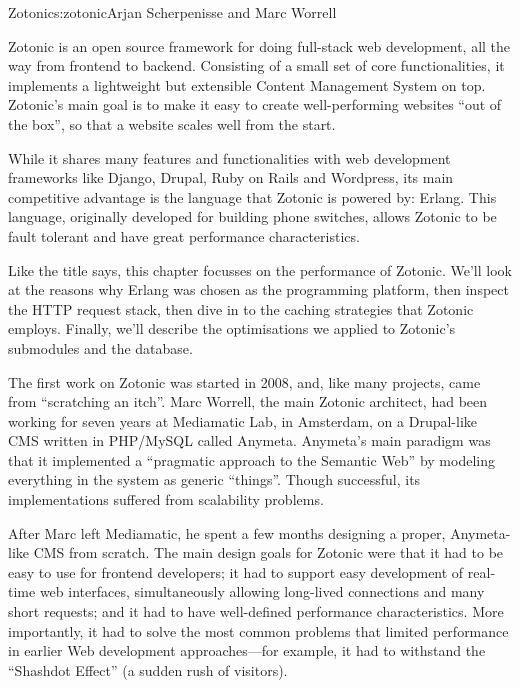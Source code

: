 \begin{aosachapter}{Zotonic}{s:zotonic}{Arjan Scherpenisse and Marc Worrell}


Zotonic is an open source framework for doing full-stack web
development, all the way from frontend to backend. Consisting of a small
set of core functionalities, it implements a lightweight but extensible
Content Management System on top. Zotonic's main goal is to make it easy
to create well-performing websites ``out of the box'', so that a website
scales well from the start.

While it shares many features and functionalities with web development
frameworks like Django, Drupal, Ruby on Rails and Wordpress, its main
competitive advantage is the language that Zotonic is powered by:
Erlang. This language, originally developed for building phone switches,
allows Zotonic to be fault tolerant and have great performance
characteristics.

Like the title says, this chapter focusses on the performance of
Zotonic. We'll look at the reasons why Erlang was chosen as the
programming platform, then inspect the HTTP request stack, then dive in
to the caching strategies that Zotonic employs. Finally, we'll describe
the optimisations we applied to Zotonic's submodules and the database.


The first work on Zotonic was started in 2008, and, like many projects,
came from ``scratching an itch''. Marc Worrell, the main Zotonic
architect, had been working for seven years at Mediamatic Lab, in
Amsterdam, on a Drupal-like CMS written in PHP/MySQL called Anymeta.
Anymeta's main paradigm was that it implemented a ``pragmatic approach
to the Semantic Web'' by modeling everything in the system as generic
``things''. Though successful, its implementations suffered from
scalability problems.

After Marc left Mediamatic, he spent a few months designing a proper,
Anymeta-like CMS from scratch. The main design goals for Zotonic were
that it had to be easy to use for frontend developers; it had to support
easy development of real-time web interfaces, simultaneously allowing
long-lived connections and many short requests; and it had to have
well-defined performance characteristics. More importantly, it had to
solve the most common problems that limited performance in earlier Web
development approaches---for example, it had to withstand the ``Shashdot
Effect'' (a sudden rush of visitors).


\end{aosachapter}
